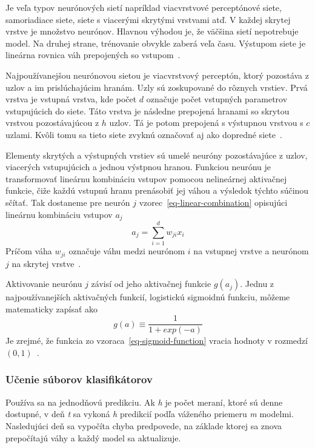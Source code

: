 \documentclass[a4paper,slovak,12pt,appendix]{article}
\begin{document}
Je veľa typov neurónových sietí napríklad viacvrstvové perceptónové siete,
samoriadiace siete, siete s viacerými skrytými vrstvami atď. V každej skrytej
vrstve je množstvo neurónov. Hlavnou výhodou je, že väčšina sietí nepotrebuje
model. Na druhej strane, trénovanie obvykle zaberá veľa času. Výstupom siete
je lineárna rovnica váh prepojených so vstupom~\cite{KumarSingh2013}.

Najpoužívanejšou neurónovou sietou je viacvrstvový perceptón, ktorý pozostáva
z uzlov a im prislúchajúcim hranám. Uzly sú zoskupované do rôznych vrstiev.
Prvá vrstva je vstupná vrstva, kde počet $d$ označuje počet vstupných parametrov
vstupujúcich do siete. Táto vrstva je následne prepojená hranami so skrytou
vrstvou pozostávajúcou z $h$ uzlov. Tá je potom prepojená s výstupnou vrstvou
s $c$ uzlami. Kvôli tomu sa tieto siete zvyknú označovať aj ako dopredné
siete~\cite{Merz1998}.

Elementy skrytých a výstupných vrstiev sú umelé neuróny pozostávajúce z uzlov,
viacerých vstupujúcich a jednou výstpnou hranou. Funkciou neurónu je
transformovať lineárnu kombináciu vstupov pomocou nelineárnej aktivačnej
funkcie, čiže každú vstupnú hranu prenásobiť jej váhou a výsledok týchto súčinou
sčítať. Tak dostaneme pre neurón $j$ vzorec~\ref{eq-linear-combination}
opisujúci lineárnu kombináciu vstupov $a_j$
\begin{equation}
  a_j = \sum_{i=1}^{d} w_{ji} x_i
  \label{eq-linear-combination}
\end{equation}
Príčom váha $w_{ji}$ označuje váhu medzi neurónom $i$ na vstupnej vrstve
a neurónom $j$ na skrytej vrstve~\cite{Merz1998}.

Aktivovanie neurónu $j$ závisí od jeho aktivačnej funkcie $g(a_j)$. Jednu
z najpoužívanejších aktivačných funkcií, logistickú sigmoidnú funkciu, môžeme
matematicky zapísať ako
\begin{equation}
  g(a) \equiv \frac{1}{1 + exp(-a)}
  \label{eq-sigmoid-function}
\end{equation}
Je zrejmé, že funkcia zo vzoraca~\ref{eq-sigmoid-function} vracia hodnoty
v rozmedzí $(0,1)$~\cite{Merz1998}.


\subsubsection{Učenie súborov klasifikátorov}
Používa sa na jednodňovú predikciu. Ak \textit{h} je počet meraní, ktoré sú
denne dostupné, v deň \textit{t} sa vykoná \textit{h} predikcií podľa váženého
priemeru \textit{m} modelmi. Nasledujúci deň sa vypočíta chyba predpovede,
na základe ktorej sa znova prepočítajú váhy a každý model sa
aktualizuje\cite{Grmanova2016}.
\end{document}
